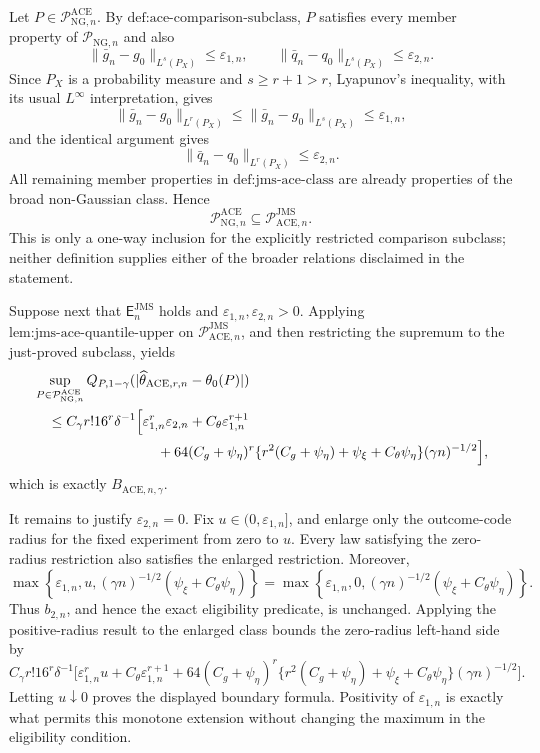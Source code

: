 Let \(P\in\mathcal P_{\mathrm{NG},n}^{\mathrm{ACE}}\).  By \(\text{def:ace-comparison-subclass}\), \(P\) satisfies every member property of \(\mathcal P_{\mathrm{NG},n}\) and also
\[
 \lVert\bar g_n-g_0\rVert_{L^s(P_X)}\le\varepsilon_{1,n},
 \qquad
 \lVert\bar q_n-q_0\rVert_{L^s(P_X)}\le\varepsilon_{2,n}.
\]
Since \(P_X\) is a probability measure and \(s\ge r+1>r\), Lyapunov's inequality, with its usual \(L^{\infty}\) interpretation, gives
\[
 \lVert\bar g_n-g_0\rVert_{L^r(P_X)}
 \le\lVert\bar g_n-g_0\rVert_{L^s(P_X)}
 \le\varepsilon_{1,n},
\]
and the identical argument gives
\[
 \lVert\bar q_n-q_0\rVert_{L^r(P_X)}
 \le\varepsilon_{2,n}.
\]
All remaining member properties in \(\text{def:jms-ace-class}\) are already properties of the broad non-Gaussian class.  Hence
\[
 \mathcal P_{\mathrm{NG},n}^{\mathrm{ACE}}
 \subseteq\mathcal P_{\mathrm{ACE},n}^{\mathrm{JMS}}.
\]
This is only a one-way inclusion for the explicitly restricted comparison subclass; neither definition supplies either of the broader relations disclaimed in the statement.

Suppose next that \(\mathsf E_n^{\mathrm{JMS}}\) holds and \(\varepsilon_{1,n},\varepsilon_{2,n}>0\).  Applying \(\text{lem:jms-ace-quantile-upper}\) on \(\mathcal P_{\mathrm{ACE},n}^{\mathrm{JMS}}\), and then restricting the supremum to the just-proved subclass, yields
\[
\begin{aligned}
 &\sup_{P\in\mathcal P_{\mathrm{NG},n}^{\mathrm{ACE}}}
 Q_{P,1-\gamma}(|\widehat\theta_{\mathrm{ACE},r,n}-\theta_0(P)|)\\
 &\quad\le C_{\gamma}r!16^r\delta^{-1}
 \Big[\varepsilon_{1,n}^r\varepsilon_{2,n}
 +C_{\theta}\varepsilon_{1,n}^{r+1}\\
 &\hspace{31mm}
 +64(C_g+\psi_{\eta})^r
 \{r^2(C_g+\psi_{\eta})+\psi_{\xi}+C_{\theta}\psi_{\eta}\}
 (\gamma n)^{-1/2}\Big],
\end{aligned}
\]
which is exactly \(B_{\mathrm{ACE},n,\gamma}\).

It remains to justify \(\varepsilon_{2,n}=0\).  Fix \(u\in(0,\varepsilon_{1,n}]\), and enlarge only the outcome-code radius for the fixed experiment from zero to \(u\).  Every law satisfying the zero-radius restriction also satisfies the enlarged restriction.  Moreover,
\[
 \max\!\left\{\varepsilon_{1,n},u,
   (\gamma n)^{-1/2}(\psi_{\xi}+C_{\theta}\psi_{\eta})\right\}
 =
 \max\!\left\{\varepsilon_{1,n},0,
   (\gamma n)^{-1/2}(\psi_{\xi}+C_{\theta}\psi_{\eta})\right\}.
\]
Thus \(b_{2,n}\), and hence the exact eligibility predicate, is unchanged.  Applying the positive-radius result to the enlarged class bounds the zero-radius left-hand side by
\[
 C_{\gamma}r!16^r\delta^{-1}
 \Big[\varepsilon_{1,n}^ru+C_{\theta}\varepsilon_{1,n}^{r+1}
 +64(C_g+\psi_{\eta})^r
 \{r^2(C_g+\psi_{\eta})+\psi_{\xi}+C_{\theta}\psi_{\eta}\}
 (\gamma n)^{-1/2}\Big].
\]
Letting \(u\downarrow0\) proves the displayed boundary formula.  Positivity of \(\varepsilon_{1,n}\) is exactly what permits this monotone extension without changing the maximum in the eligibility condition.

